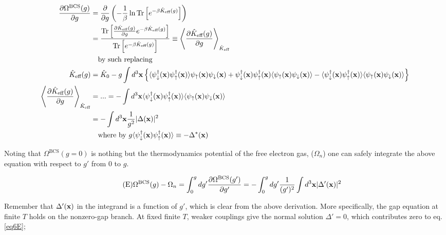 \[\begin{split}
\frac{\partial \Omega^{\text{BCS}}(g)}{\partial g} &= \frac{\partial}{\partial g}\left(-\frac{1}{\beta}\ln\text{Tr}\left[e^{-\beta\hat{K}_{\text{eff}}(g)}\right]\right) \\
&=\frac{\text{Tr}\left[\frac{\partial \hat{K}_{\text{eff}}(g)}{\partial g} e^{-\beta\hat{K}_{\text{eff}}(g)}\right]}{\text{Tr}\left[e^{-\beta\hat{K}_{\text{eff}}(g)}\right]}\equiv\left\langle\frac{\partial \hat{K}_{\text{eff}}(g)}{\partial g}\right\rangle_{\hat{K}_{\text{eff}}}\\
&\quad\text{by such replacing}\\
\hat{K}_{\text{eff}}(g) &= \hat{K}_0-g\int d^3{\bf x}\left\{\langle\psi_{\downarrow}^\dagger({\bf x})\psi_{\uparrow}^\dagger({\bf x})\rangle\psi_{\uparrow}({\bf x})\psi_{\downarrow}({\bf x}) +\psi_{\downarrow}^\dagger({\bf x})\psi_{\uparrow}^\dagger({\bf x})\langle\psi_{\uparrow}({\bf x})\psi_{\downarrow}({\bf x})\rangle - \langle\psi_{\downarrow}^\dagger({\bf x})\psi_{\uparrow}^\dagger({\bf x})\rangle\langle\psi_{\uparrow}({\bf x})\psi_{\downarrow}({\bf x})\rangle\right\}\\
\left\langle\frac{\partial \hat{K}_{\text{eff}}(g)}{\partial g}\right\rangle_{\hat{K}_{\text{eff}}} &= ... = -\int d^3{\bf x} \langle\psi_{\downarrow}^\dagger({\bf x})\psi_{\uparrow}^\dagger({\bf x})\rangle\langle\psi_{\uparrow}({\bf x})\psi_{\downarrow}({\bf x})\rangle\\
&= -\int d^3{\bf x}\frac{1}{g^2}|\Delta({\bf x})|^2\\
&\quad\text{where by }g\langle\psi_{\downarrow}^\dagger({\bf x})\psi_{\uparrow}^\dagger({\bf x})\rangle \equiv - \Delta^*({\bf x})
\end{split}\]

Noting that $\Omega^{\text{BCS}}(g=0)$ is nothing but the thermodynamics potential of the free electron gas, ($\Omega_n$) one can safely integrate the above equation with respect to $g'$ from $0$ to $g$. 

\begin{align}\tag{E}\label{eq6E}
\Omega^{\text{BCS}}(g) - \Omega_n = \int_0^g dg' \frac{\partial \Omega^{\text{BCS}}(g')}{\partial g'} = -\int_0^g dg' \frac{1}{(g')^2}\int d^3{\bf x}|\Delta'({\bf x})|^2
\end{align}

Remember that $\Delta'({\bf x})$ in the integrand is a function of $g'$, which is clear from the above derivation. More specifically, the gap equation at finite $T$ holds on the nonzero-gap branch. At fixed finite $T$, weaker couplings give the normal solution $\Delta'=0$, which contributes zero to eq.\eqref{eq6E};

